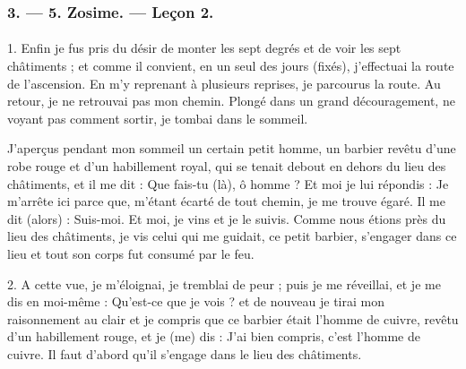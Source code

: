 \documentclass[a4paper, 11pt, oneside, polutonikogreek, french]{article}
\begin{document}
\bigskip
\centerline{\EightStarTaper}
\centerline{\EightStarTaper\EightStarTaper}
\bigskip

\subsubsection{3. --- 5. Zosime. --- Leçon 2.}
\paragraph{}
1. Enfin je fus pris du désir de monter les sept degrés et de voir les sept châtiments ; et comme il convient, en un seul des jours (fixés), j'effectuai la route de l'ascension. En m'y reprenant à plusieurs reprises, je parcourus la route. Au retour, je ne retrouvai pas mon chemin. Plongé dans un grand découragement, ne voyant pas comment sortir, je tombai dans le sommeil.

J'aperçus pendant mon sommeil un certain petit homme, un barbier revêtu d'une robe rouge et d'un habillement royal, qui se tenait debout en dehors du lieu des châtiments, et il me dit : Que fais-tu (là), ô homme ? Et moi je lui répondis : Je m'arrête ici parce que, m'étant écarté de tout chemin, je me trouve égaré. Il me dit (alors) : Suis-moi. Et moi, je vins et je le suivis. Comme nous étions près du lieu des châtiments, je vis celui qui me guidait, ce petit barbier, s'engager dans ce lieu et tout son corps fut consumé par le feu.

2. A cette vue, je m'éloignai, je tremblai de peur ; puis je me réveillai, et je me dis en moi-même : Qu'est-ce que je vois ? et de nouveau je tirai mon raisonnement au clair et je compris que ce barbier était l'homme de cuivre, revêtu d'un habillement rouge, et je (me) dis : J'ai bien compris, c'est l'homme de cuivre. Il faut d'abord qu'il s'engage dans le lieu des châtiments.
\end{document}
